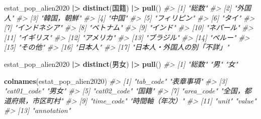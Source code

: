 \documentclass[
  xelatex, ja=standard]{bxjsbook}
\newenvironment{Shaded}{\begin{snugshade}}{\end{snugshade}}
\newcommand{\CommentTok}[1]{\textcolor[rgb]{0.56,0.35,0.01}{\textit{#1}}}
\newcommand{\FunctionTok}[1]{\textcolor[rgb]{0.13,0.29,0.53}{\textbf{#1}}}
\newcommand{\NormalTok}[1]{#1}
\newcommand{\SpecialCharTok}[1]{\textcolor[rgb]{0.81,0.36,0.00}{\textbf{#1}}}
\theoremstyle{definition}
\theoremstyle{definition}
\theoremstyle{definition}
\theoremstyle{definition}
\theoremstyle{remark}
\begin{document}
\begin{Shaded}
\begin{Highlighting}[]
\NormalTok{estat\_pop\_alien2020 }\SpecialCharTok{|\textgreater{}} \FunctionTok{distinct}\NormalTok{(国籍) }\SpecialCharTok{|\textgreater{}} \FunctionTok{pull}\NormalTok{()}
\CommentTok{\#\textgreater{}  [1] "総数"                      }
\CommentTok{\#\textgreater{}  [2] "外国人"                    }
\CommentTok{\#\textgreater{}  [3] "韓国，朝鮮"                }
\CommentTok{\#\textgreater{}  [4] "中国"                      }
\CommentTok{\#\textgreater{}  [5] "フィリピン"                }
\CommentTok{\#\textgreater{}  [6] "タイ"                      }
\CommentTok{\#\textgreater{}  [7] "インドネシア"              }
\CommentTok{\#\textgreater{}  [8] "ベトナム"                  }
\CommentTok{\#\textgreater{}  [9] "インド"                    }
\CommentTok{\#\textgreater{} [10] "ネパール"                  }
\CommentTok{\#\textgreater{} [11] "イギリス"                  }
\CommentTok{\#\textgreater{} [12] "アメリカ"                  }
\CommentTok{\#\textgreater{} [13] "ブラジル"                  }
\CommentTok{\#\textgreater{} [14] "ペルー"                    }
\CommentTok{\#\textgreater{} [15] "その他"                    }
\CommentTok{\#\textgreater{} [16] "日本人"                    }
\CommentTok{\#\textgreater{} [17] "日本人・外国人の別「不詳」"}
\end{Highlighting}
\end{Shaded}

\begin{Shaded}
\begin{Highlighting}[]
\NormalTok{estat\_pop\_alien2020 }\SpecialCharTok{|\textgreater{}} \FunctionTok{distinct}\NormalTok{(男女) }\SpecialCharTok{|\textgreater{}} \FunctionTok{pull}\NormalTok{()}
\CommentTok{\#\textgreater{} [1] "総数" "男"   "女"}
\end{Highlighting}
\end{Shaded}

\begin{Shaded}
\begin{Highlighting}[]
\FunctionTok{colnames}\NormalTok{(estat\_pop\_alien2020)}
\CommentTok{\#\textgreater{}  [1] "tab\_code"                 "表章事項"                }
\CommentTok{\#\textgreater{}  [3] "cat01\_code"               "男女"                    }
\CommentTok{\#\textgreater{}  [5] "cat02\_code"               "国籍"                    }
\CommentTok{\#\textgreater{}  [7] "area\_code"                "全国，都道府県，市区町村"}
\CommentTok{\#\textgreater{}  [9] "time\_code"                "時間軸（年次）"          }
\CommentTok{\#\textgreater{} [11] "unit"                     "value"                   }
\CommentTok{\#\textgreater{} [13] "annotation"}
\end{Highlighting}
\end{Shaded}
\end{document}
